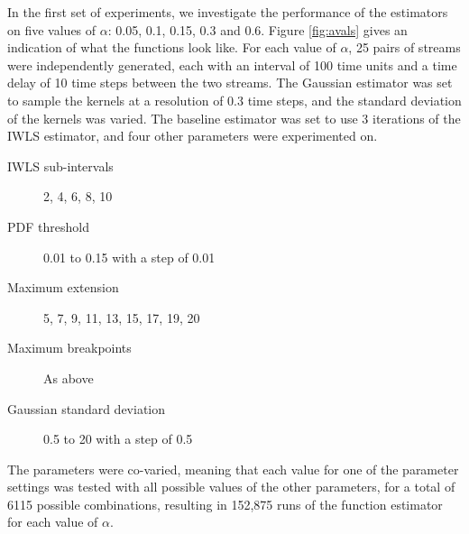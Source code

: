 \documentclass[a4paper,11pt]{article}
\begin{document}
In the first set of experiments, we investigate the performance of the
estimators on five values of $\alpha$: 0.05, 0.1, 0.15, 0.3 and 0.6. Figure
\ref{fig:avals} gives an indication of what the functions look like. For
each value of $\alpha$, 25 pairs of streams were independently generated, each
with an interval of 100 time units and a time delay of 10 time steps between the
two streams. The Gaussian estimator was set to sample the kernels at a
resolution of 0.3 time steps, and the standard deviation of the kernels was
varied. The baseline estimator was set to use 3 iterations of the
IWLS estimator, and four other parameters were experimented on.
\begin{description}
\item[IWLS sub-intervals] 2, 4, 6, 8, 10
\item[PDF threshold] 0.01 to 0.15 with a step of 0.01
\item[Maximum extension] 5, 7, 9, 11, 13, 15, 17, 19, 20
\item[Maximum breakpoints] As above
\item[Gaussian standard deviation] 0.5 to 20 with a step of 0.5
\end{description}
The parameters were co-varied, meaning that each value for one
of the parameter settings was tested with all possible values of the other
parameters, for a total of 6115 possible combinations, resulting in 152,875 runs
of the function estimator for each value of $\alpha$.
\end{document}
